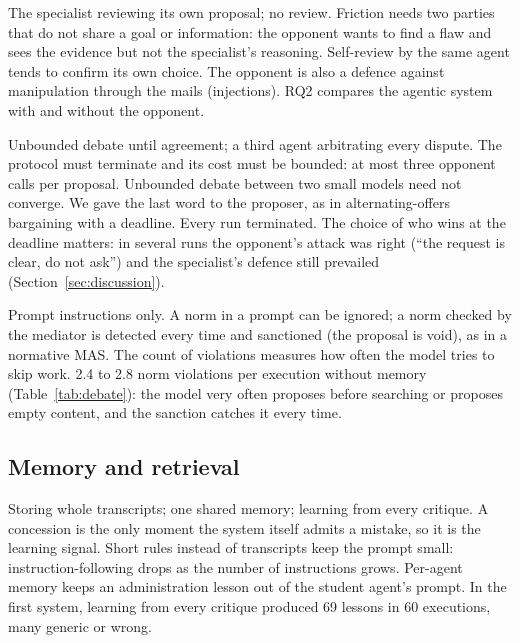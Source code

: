 \documentclass[11pt,a4paper]{article}
\begin{document}
{The specialist reviewing its own proposal; no review.}
{Friction needs two parties that do not share a goal or information: the opponent wants to find a flaw and sees the
evidence but not the specialist's reasoning. Self-review by the same agent tends to confirm its own choice. The
opponent is also a defence against manipulation through the mails (injections).}
{RQ2 compares the agentic system with and without the opponent.}

{Unbounded debate until agreement; a third agent arbitrating every dispute.}
{The protocol must terminate and its cost must be bounded: at most three opponent calls per proposal. Unbounded
debate between two small models need not converge. We gave the last word to the proposer, as in alternating-offers
bargaining with a deadline.}
{Every run terminated. The choice of who wins at the deadline matters: in several runs the opponent's attack was
right (``the request is clear, do not ask'') and the specialist's defence still prevailed (Section~\ref{sec:discussion}).}

{Prompt instructions only.}
{A norm in a prompt can be ignored; a norm checked by the mediator is detected every time and sanctioned (the
proposal is void), as in a normative MAS. The count of violations measures how often the model tries to skip work.}
{2.4 to 2.8 norm violations per execution without memory (Table~\ref{tab:debate}): the model very often proposes
before searching or proposes empty content, and the sanction catches it every time.}

\subsection{Memory and retrieval}
{Storing whole transcripts; one shared memory; learning from every critique.}
{A concession is the only moment the system itself admits a mistake, so it is the learning signal. Short rules
instead of transcripts keep the prompt small: instruction-following drops as the number of instructions grows.
Per-agent memory keeps an administration lesson out of the student agent's prompt.}
{In the first system, learning from every critique produced 69 lessons in 60 executions, many generic or wrong.}
\end{document}
